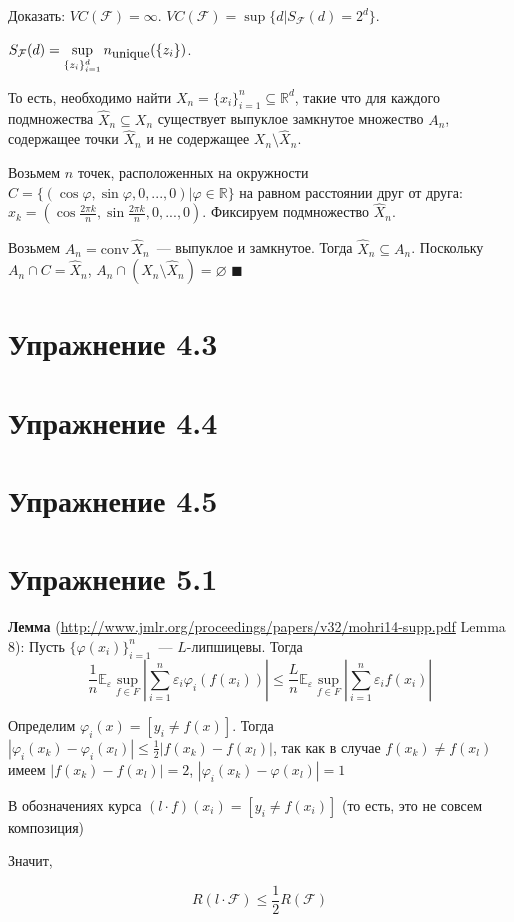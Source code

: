 \documentclass[a4paper]{article}
\newcommand{\F}{\mathcal{F}}
\newcommand{\R}{\mathbb{R}}
\newcommand{\conv}{\mbox{conv}\,}
\newcommand{\E}{\mathbb{E}}
\def\eps{\varepsilon}
\begin{document}
Доказать: $VC(\F)=\infty$. $VC(\F)=\sup\{d\big| S_\F (d)=2^d\}$.

$S_\F (d)=\sup\limits_{\{z_i\}_{i=1}^d} n_{\mbox{\small unique}}(\{z_i\})$.

То есть, необходимо найти $X_n=\{x_i\}_{i=1}^n\subseteq \R^d$, такие что для каждого подмножества $\hat{X}_n\subseteq X_n$ существует выпуклое замкнутое множество $A_n$, содержащее точки $\hat{X}_n$ и не содержащее $X_n\setminus \hat{X}_n$.

Возьмем $n$ точек, расположенных на окружности $C=\{(\cos\varphi,\sin\varphi, 0,...,0)\big| \varphi\in\R\}$ на равном расстоянии друг от друга: $x_k=(\cos \frac{2\pi k}{n},\sin \frac{2\pi k}{n},0,...,0)$. Фиксируем подмножество $\hat{X}_n$.

Возьмем $A_n=\conv\hat{X}_n$~--- выпуклое и замкнутое. Тогда $\hat{X}_n\subseteq A_n$. Поскольку $A_n\cap C=\hat{X}_n$, $A_n\cap (X_n\setminus \hat{X}_n)=\varnothing$ $\blacksquare$
\section*{Упражнение 4.3}
\section*{Упражнение 4.4}
\section*{Упражнение 4.5}
\section*{Упражнение 5.1}
{\bf Лемма} (\url{http://www.jmlr.org/proceedings/papers/v32/mohri14-supp.pdf} Lemma 8): Пусть $\{\varphi(x_i)\}_{i=1}^n$~--- $L$-липшицевы. Тогда
$$\frac{1}{n}\E_\eps \sup\limits_{f\in F}|\sum\limits_{i=1}^n \eps_i \varphi_i(f(x_i))|\leqslant \frac{L}{n}\E_\eps \sup\limits_{f\in F}|\sum\limits_{i=1}^n \eps_i f(x_i)|$$

Определим $\varphi_i(x)=[y_i\neq f(x)]$. Тогда $|\varphi_i(x_k)-\varphi_i(x_l)|\leqslant \frac{1}{2}|f(x_k)-f(x_l)|$, так как в случае $f(x_k)\neq f(x_l)$ имеем $|f(x_k)-f(x_l)|=2$, $|\varphi_i(x_k)-\varphi(x_l)|=1$

В обозначениях курса $(l\cdot f)(x_i)=[y_i\neq f(x_i)]$ (то есть, это не совсем композиция)

Значит, 

$$\boxed{R(l\cdot \F)\leqslant \frac{1}{2}R(\F)}$$
\end{document}
